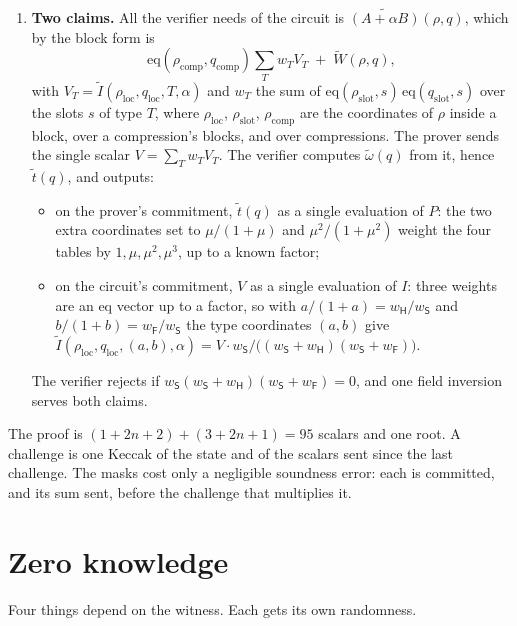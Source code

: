 \documentclass[11pt]{article}
\newcommand{\eq}{\mathrm{eq}}
\newcommand{\mle}[1]{\widetilde{#1}}
\newcommand{\comb}{\omega}
\newcommand{\idx}{I}
\newcommand{\loc}{\mathrm{loc}}
\begin{document}
\begin{enumerate}[leftmargin=*,itemsep=0.5em]
  \item \textbf{Two claims.} All the verifier needs of the circuit is $\mle{(A + \alpha B)}(\rho, q)$, which by the block form is
  \[
    \eq(\rho_{\mathrm{comp}}, q_{\mathrm{comp}}) \sum_T w_T V_T \;+\; \mle W(\rho, q),
  \]
  with $V_T = \mle\idx(\rho_\loc, q_\loc, T, \alpha)$ and $w_T$ the sum of $\eq(\rho_{\mathrm{slot}}, s)\, \eq(q_{\mathrm{slot}}, s)$ over the slots $s$ of type $T$,
  where $\rho_\loc$, $\rho_{\mathrm{slot}}$, $\rho_{\mathrm{comp}}$ are the coordinates of $\rho$ inside a block, over a compression's blocks, and over compressions. The prover sends the single scalar $V = \sum_T w_T V_T$. The verifier computes $\mle\comb(q)$ from it, hence $\mle t(q)$, and outputs:
  \begin{itemize}
    \item on the prover's commitment, $\mle t(q)$ as a single evaluation of $P$: the two extra coordinates set to $\mu/(1+\mu)$ and $\mu^2/(1+\mu^2)$ weight the four tables by $1, \mu, \mu^2, \mu^3$, up to a known factor;
    \item on the circuit's commitment, $V$ as a single evaluation of $\idx$: three weights are an eq vector up to a factor, so with $a/(1+a) = w_{\mathsf H}/w_{\mathsf S}$ and $b/(1+b) = w_{\mathsf F}/w_{\mathsf S}$ the type coordinates $(a, b)$ give $\mle\idx(\rho_\loc, q_\loc, (a, b), \alpha) = V \cdot w_{\mathsf S} / \bigl((w_{\mathsf S} + w_{\mathsf H})(w_{\mathsf S} + w_{\mathsf F})\bigr)$.
  \end{itemize}
  The verifier rejects if $w_{\mathsf S}(w_{\mathsf S} + w_{\mathsf H})(w_{\mathsf S} + w_{\mathsf F}) = 0$, and one field inversion serves both claims.
\end{enumerate}

\noindent The proof is $(1 + 2n + 2) + (3 + 2n + 1) = 95$ scalars and one root. A challenge is one Keccak of the state and of the scalars sent since the last challenge. The masks cost only a negligible soundness error: each is committed, and its sum sent, before the challenge that multiplies it.

\section{Zero knowledge}

Four things depend on the witness. Each gets its own randomness.
\end{document}
